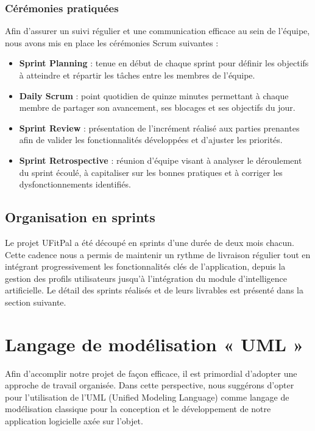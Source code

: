 ﻿\documentclass[a4paper,12pt]{report}
\begin{document}
\subsubsection{Cérémonies pratiquées}
Afin d'assurer un suivi régulier et une communication efficace au sein de l'équipe, nous 
avons mis en place les cérémonies Scrum suivantes :
\begin{itemize}
    \item \textbf{Sprint Planning} : tenue en début de chaque sprint pour définir les 
    objectifs à atteindre et répartir les tâches entre les membres de l'équipe.
    \item \textbf{Daily Scrum} : point quotidien de quinze minutes permettant à chaque 
    membre de partager son avancement, ses blocages et ses objectifs du jour.
    \item \textbf{Sprint Review} : présentation de l'incrément réalisé aux parties 
    prenantes afin de valider les fonctionnalités développées et d'ajuster les priorités.
    \item \textbf{Sprint Retrospective} : réunion d'équipe visant à analyser le déroulement 
    du sprint écoulé, à capitaliser sur les bonnes pratiques et à corriger les 
    dysfonctionnements identifiés.
\end{itemize}

\subsection{Organisation en sprints}
Le projet UFitPal a été découpé en sprints d'une durée de deux mois chacun. Cette 
cadence nous a permis de maintenir un rythme de livraison régulier tout en intégrant 
progressivement les fonctionnalités clés de l'application, depuis la gestion des profils 
utilisateurs jusqu'à l'intégration du module d'intelligence artificielle. Le détail des 
sprints réalisés et de leurs livrables est présenté dans la section suivante.

\section{Langage de modélisation « UML »}

Afin d'accomplir notre projet de façon efficace, il est primordial d'adopter une approche de travail organisée. Dans cette perspective, nous suggérons d'opter pour l'utilisation de l'UML (Unified Modeling Language) comme langage de modélisation classique pour la conception et le développement de notre application logicielle axée sur l'objet.
\end{document}
